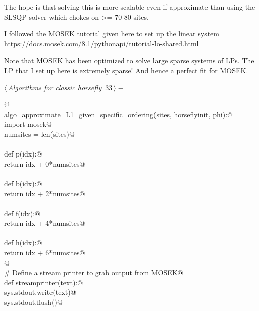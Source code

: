 \documentclass[11.5pt]{report}
\begin{document}
The hope is that solving this is more scalable even if approximate
than using the SLSQP solver which chokes on >= 70-80 sites. 
    
I followed the MOSEK tutorial given here to set up the linear system
\url{https://docs.mosek.com/8.1/pythonapi/tutorial-lo-shared.html}
    
Note that MOSEK has been optimized to solve large \underline{sparse} systems of LPs. 
The LP that I set up here is extremely sparse! And hence a perfect fit 
for MOSEK. 


\begin{flushleft} \small\label{scrap44}\raggedright\small
{} $\langle\,${\itshape Algorithms for classic horsefly}\nobreak\ {\footnotesize {33}}$\,\rangle\equiv$
\vspace{-1ex}
\begin{list}{}{} \item
\mbox{}\verb@ @\\
\mbox{}\verb@def  algo_approximate_L1_given_specific_ordering(sites, horseflyinit, phi):@\\
\mbox{}\verb@    import mosek@\\
\mbox{}\verb@    numsites = len(sites)@\\
\mbox{}\verb@@\\
\mbox{}\verb@    def p(idx):@\\
\mbox{}\verb@        return idx + 0*numsites@\\
\mbox{}\verb@@\\
\mbox{}\verb@    def b(idx):@\\
\mbox{}\verb@        return idx + 2*numsites@\\
\mbox{}\verb@@\\
\mbox{}\verb@    def f(idx):@\\
\mbox{}\verb@        return idx + 4*numsites@\\
\mbox{}\verb@@\\
\mbox{}\verb@    def h(idx):@\\
\mbox{}\verb@        return idx + 6*numsites@\\
\mbox{}\verb@    @\\
\mbox{}\verb@    # Define a stream printer to grab output from MOSEK@\\
\mbox{}\verb@    def streamprinter(text):@\\
\mbox{}\verb@        sys.stdout.write(text)@\\
\mbox{}\verb@        sys.stdout.flush()@\\

\end{list}
\end{flushleft}
\end{document}
